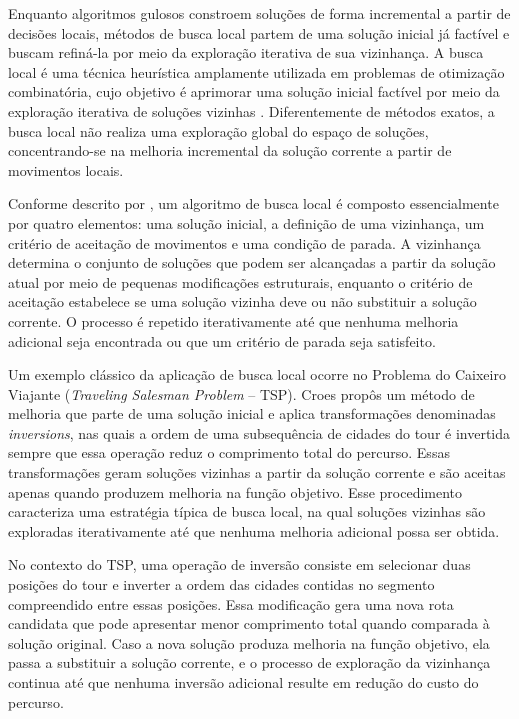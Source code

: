 Enquanto algoritmos gulosos constroem soluções de forma incremental a partir de decisões locais, métodos de busca local partem de uma solução inicial 
já factível e buscam refiná-la por meio da exploração iterativa de sua vizinhança. A busca local é uma técnica heurística amplamente utilizada em problemas 
de otimização combinatória, cujo objetivo é aprimorar uma solução inicial factível por meio da exploração iterativa de soluções vizinhas \cite{Gendreau2010}. 
Diferentemente de métodos exatos, a busca local não realiza uma exploração global do espaço de soluções, concentrando-se na melhoria incremental da 
solução corrente a partir de movimentos locais.

Conforme descrito por \cite{Gendreau2010}, um algoritmo de busca local é composto essencialmente por quatro elementos: uma solução inicial, 
a definição de uma vizinhança, um critério de aceitação de movimentos e uma condição de parada. A vizinhança determina o conjunto de soluções que 
podem ser alcançadas a partir da solução atual por meio de pequenas modificações estruturais, enquanto o critério de aceitação estabelece 
se uma solução vizinha deve ou não substituir a solução corrente. O processo é repetido iterativamente até que nenhuma melhoria adicional 
seja encontrada ou que um critério de parada seja satisfeito.

Um exemplo clássico da aplicação de busca local ocorre no Problema do Caixeiro Viajante (\textit{Traveling Salesman Problem} -- TSP). 
Croes \cite{Croes1958} propôs um método de melhoria que parte de uma solução inicial e aplica transformações denominadas 
\textit{inversions}, nas quais a ordem de uma subsequência de cidades do tour é invertida sempre que essa operação reduz o comprimento total do percurso. 
Essas transformações geram soluções vizinhas a partir da solução corrente e são aceitas apenas quando produzem melhoria na função objetivo. 
Esse procedimento caracteriza uma estratégia típica de busca local, na qual soluções vizinhas são exploradas iterativamente até que 
nenhuma melhoria adicional possa ser obtida.

No contexto do TSP, uma operação de inversão consiste em selecionar duas posições do tour e inverter a ordem das cidades contidas no 
segmento compreendido entre essas posições. Essa modificação gera uma nova rota candidata que pode apresentar menor comprimento total 
quando comparada à solução original. Caso a nova solução produza melhoria na função objetivo, ela passa a substituir a solução corrente, 
e o processo de exploração da vizinhança continua até que nenhuma inversão adicional resulte em redução do custo do percurso.


